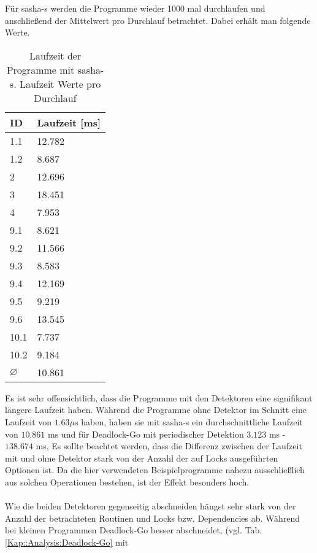 Für sasha-s werden die Programme wieder 1000 mal durchlaufen und anschließend 
der Mittelwert pro Durchlauf betrachtet. Dabei erhält man folgende Werte.
\begin{table}[H]
    \centering
    \begin{tabular}{|l|l|}
    \hline
    ID   & Laufzeit [ms] \\ \hline
    1.1  & 12.782        \\ \hline
    1.2  & 8.687         \\ \hline
    2    & 12.696        \\ \hline
    3    & 18.451        \\ \hline
    4    & 7.953         \\ \hline
    9.1  & 8.621         \\ \hline
    9.2  & 11.566        \\ \hline
    9.3  & 8.583         \\ \hline
    9.4  & 12.169        \\ \hline
    9.5  & 9.219         \\ \hline
    9.6  & 13.545         \\ \hline
    10.1 & 7.737         \\ \hline
    10.2 & 9.184         \\ \hline
    $\varnothing$ & 10.861 \\ \hline
    \end{tabular}
    \caption{Laufzeit der Programme mit sasha-s. Laufzeit Werte pro Durchlauf}
    \label{tab:my-table}
\end{table}
Es ist sehr offensichtlich, dass die Programme mit den Detektoren eine 
signifikant längere Laufzeit haben. Während die Programme ohne Detektor im 
Schnitt eine Laufzeit von $1.63\mu\text{s}$ haben, haben sie mit sasha-s ein durchschnittliche
Laufzeit von $10.861$ ms und für Deadlock-Go mit periodischer Detektion $3.123$ ms - $138.674$ ms,
Es sollte beachtet werden, 
dass die Differenz zwischen der Laufzeit mit und ohne Detektor stark 
von der Anzahl der auf Locks ausgeführten Optionen ist. Da die hier verwendeten 
Beispielprogramme nahezu ausschließlich aus solchen Operationen bestehen, ist 
der Effekt besonders hoch.\\ \\
Wie die beiden Detektoren gegenseitig abschneiden hängst sehr stark von der 
Anzahl der betrachteten Routinen und Locks bzw. Dependencies ab. Während bei 
kleinen Programmen Deadlock-Go besser abschneidet, (vgl. Tab. \ref{Kap::Analysis:Deadlock-Go} mit 
